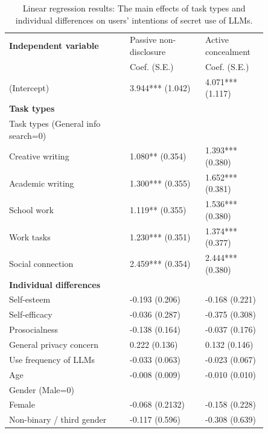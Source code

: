 \begin{table}[]
\begin{threeparttable}
    \centering
    \caption{Linear regression results: The main effects of task types and individual differences on users' intentions of secret use of LLMs.}
    \begin{tabular}{p{0.4\linewidth} p{0.25\linewidth} p{0.2\linewidth}}
    \toprule
    \textbf{Independent variable}& Passive non-disclosure& Active concealment\\
 & Coef. (S.E.)&Coef. (S.E.)\\
    \midrule
 (Intercept)& 3.944*** (1.042)&4.071*** (1.117)\\
    \multicolumn{3}{l}{\textbf{Task types}}\\
        Task types (General info search=0)& & \\
        \hspace{3mm} Creative writing& 1.080** (0.354)& 1.393*** (0.380)\\
        \hspace{3mm} Academic writing& 1.300*** (0.355)& 1.652*** (0.381)\\
        \hspace{3mm} School work& 1.119** (0.355)&1.536*** (0.380)\\
        \hspace{3mm} Work tasks& 1.230*** (0.351)&1.374*** (0.377)\\
        \hspace{3mm} Social connection& 2.459*** (0.354)&2.444*** (0.380)\\
    \multicolumn{3}{l}{\textbf{Individual differences}}\\
        Self-esteem& -0.193 (0.206)& -0.168 (0.221)\\
        Self-efficacy& -0.036 (0.287)& -0.375 (0.308)\\Prosocialness& -0.138 (0.164)& -0.037 (0.176)\\General privacy concern& 0.222 (0.136)& 0.132 (0.146)\\
        Use frequency of LLMs& -0.033 (0.063)& -0.023 (0.067)\\
        Age& -0.008 (0.009)& -0.010 (0.010)\\
    \multicolumn{3}{l}{Gender (Male=0)}\\
        \hspace{3mm} Female& -0.068 (0.2132)& -0.158 (0.228)\\
        \hspace{3mm} Non-binary / third gender& -0.117 (0.596)&-0.308 (0.639)\\

\end{tabular}
\end{threeparttable}
\end{table}
